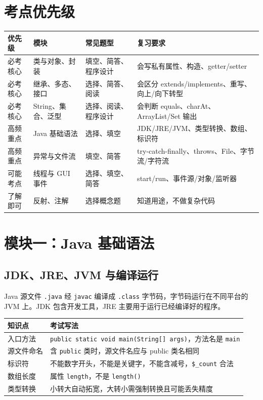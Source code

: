 \documentclass[UTF8,zihao=-4]{ctexart}
\begin{document}
\section{考点优先级}

\begin{longtable}{p{}p{}p{}p{}}
\toprule
\textbf{优先级} & \textbf{模块} & \textbf{常见题型} & \textbf{复习要求} \\
\midrule
必考核心 & 类与对象、封装 & 填空、简答、程序设计 & 会写私有属性、构造、getter/setter \\
必考核心 & 继承、多态、接口 & 选择、简答、阅读 & 会区分 extends/implements、重写、向上/向下转型 \\
必考核心 & String、集合、泛型 & 选择、阅读、程序设计 & 会判断 equals、charAt、ArrayList/Set 输出 \\
高频重点 & Java 基础语法 & 选择、填空 & JDK/JRE/JVM、类型转换、数组、标识符 \\
高频重点 & 异常与文件流 & 填空、简答 & try-catch-finally、throws、File、字节流/字符流 \\
可能考点 & 线程与 GUI 事件 & 选择、填空、简答 & start/run、事件源/对象/监听器 \\
了解即可 & 反射、注解 & 选择概念题 & 知道用途，不做复杂代码 \\
\bottomrule
\end{longtable}

\section{模块一：Java 基础语法}

\subsection{JDK、JRE、JVM 与编译运行}
\begin{keybox}[平台无关性]
Java 源文件 \texttt{.java} 经 \texttt{javac} 编译成 \texttt{.class} 字节码，字节码运行在不同平台的 JVM 上。JDK 包含开发工具，JRE 主要用于运行已经编译好的程序。
\end{keybox}

\begin{longtable}{p{}p{}}
\toprule
\textbf{知识点} & \textbf{考试写法} \\
\midrule
入口方法 & \texttt{public static void main(String[] args)}，方法名是 \texttt{main} \\
源文件命名 & 含 \texttt{public} 类时，源文件名应与 public 类名相同 \\
标识符 & 不能数字开头，不能是关键字，不能含减号，\texttt{\$\_count} 合法 \\
数组长度 & 属性 \texttt{length}，不是 \texttt{length()} \\
类型转换 & 小转大自动拓宽，大转小需强制转换且可能丢失精度 \\
\bottomrule
\end{longtable}
\end{document}
